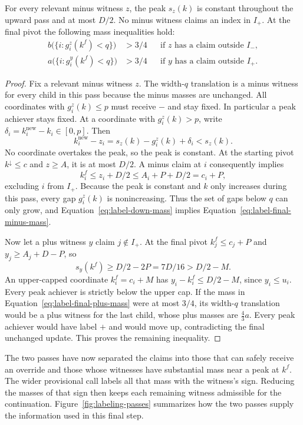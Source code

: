 \begin{lemma}
\label{lem:label-up}
For every relevant minus witness $z$, the peak $s_z(k)$ is constant
throughout the upward pass and at most $D/2$.  No minus witness
claims an index in $I_+$.  At the final pivot the following mass
inequalities hold:
\begin{align}
 b\bigl(\{i:g_i^z(k^f)<q\}\bigr)&>3/4
 &&\text{if $z$ has a claim outside $I_-$},
 \label{eq:label-final-minus-mass}\\
 a\bigl(\{i:g_i^y(k^f)<q\}\bigr)&>3/4
 &&\text{if $y$ has a claim outside $I_+$}.
 \label{eq:label-final-plus-mass}
\end{align}
\end{lemma}

\begin{proof}
Fix a relevant minus witness $z$.  The width-$q$ translation is a
minus witness for every child in this pass because the minus masses
are unchanged.  All coordinates with $g_i^z(k)\le p$ must receive
$-$ and stay fixed.  In particular a peak achiever stays fixed.
At a coordinate with $g_i^z(k)>p$, write
$\delta_i=k_i^{\mathrm{new}}-k_i\in[0,p]$.  Then
\[
 k_i^{\mathrm{new}}-z_i
    =s_z(k)-g_i^z(k)+\delta_i<s_z(k).
\]
No coordinate overtakes the peak, so the peak is constant.  At the
starting pivot $k^{\downarrow}\le c$ and $z\ge A$, it is at most
$D/2$.  A minus claim at $i$ consequently implies
\[
 k_i^f\le z_i+D/2\le A_i+P+D/2=c_i+P,
\]
excluding $i$ from $I_+$.  Because the peak is constant and $k$
only increases during this pass, every gap $g_i^z(k)$ is
nonincreasing.  Thus the set of gaps below $q$ can only grow,
and Equation~\eqref{eq:label-down-mass} implies
Equation~\eqref{eq:label-final-minus-mass}.

Now let a plus witness $y$ claim $j\notin I_+$.  At the final
pivot $k_j^f\le c_j+P$ and $y_j\ge A_j+D-P$, so
\[
 s_y(k^f)\ge D/2-2P=7D/16>D/2-M.
\]
An upper-capped coordinate $k_i^f=c_i+M$ has
$y_i-k_i^f\le D/2-M$, since $y_i\le u_i$.  Every peak
achiever is strictly below the upper cap.  If the mass in
Equation~\eqref{eq:label-final-plus-mass} were at most $3/4$,
its width-$q$ translation would be a plus witness for the last
child, whose plus masses are $\frac43 a$.  Every peak achiever
would have label $+$ and would move up, contradicting the final
unchanged update.  This proves the remaining inequality.
\end{proof}

The two passes have now separated the claims into those that can
safely receive an override and those whose witnesses have substantial
mass near a peak at $k^f$.  The wider provisional call labels all
that mass with the witness's sign.  Reducing the masses of that sign
then keeps each remaining witness admissible for the continuation.
Figure~\ref{fig:labeling-passes} summarizes how the two passes supply
the information used in this final step.

